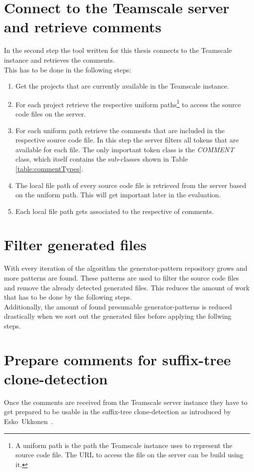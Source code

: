 \section{Connect to the Teamscale server and retrieve comments}
\label{section:retrieveComments}
In the second step the tool written for this thesis connects to the Teamscale instance and retrieves the comments.\\
This has to be done in the following steps:
\begin{enumerate}
	\item Get the projects that are currently available in the Teamscale instance. 
	\item For each project retrieve the respective uniform paths\footnote{A uniform path is the path the Teamscale instance uses to represent the source code file. The URL to access the file on the server can be build using it.} to access the source code files on the server.
	\item For each uniform path retrieve the comments that are included in the respective source code file. In this step the server filters all tokens that are available for each file. The only important token class is the \textit{COMMENT} class, which itself contains the sub-classes shown in Table \ref{table:commentTypes}.
	\item The local file path of every source code file is retrieved from the server based on the uniform path. This will get important later in the evaluation.
	\item Each local file path gets associated to the respective  of comments.
\end{enumerate}



\section{Filter generated files}
With every iteration of the algorithm the generator-pattern repository grows and more patterns are found. These patterns are used to filter the source code files and remove the already detected generated files. This reduces the amount of work that has to be done by the following steps. \\
Additionally, the amount of found presumable generator-patterns is reduced drastically when we sort out the generated files before applying the follwing steps.

\section{Prepare comments for suffix-tree clone-detection}
Once the comments are received from the Teamscale server instance they have to get prepared to be usable in the suffix-tree clone-detection as introduced by Esko~Ukkonen~\cite{Ukkonen1995}\cite{Ukkonen1993}.\\

